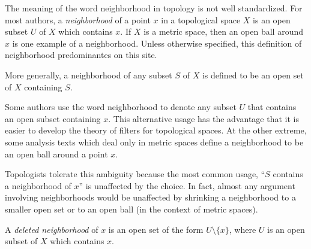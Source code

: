 \documentclass{article}
\begin{document}
The meaning of the word neighborhood in topology is not well standardized. For most authors, a \emph{neighborhood} of a point $x$ in a topological space $X$ is an open subset $U$ of $X$ which contains $x$. If $X$ is a metric space, then an open ball around $x$ is one example of a neighborhood. Unless otherwise specified, this definition of neighborhood predominantes on this site.

More generally, a neighborhood of any subset $S$ of $X$ is defined to be an open set of $X$ containing $S$.

Some authors use the word neighborhood to denote any subset $U$ that contains an open subset containing $x$. This alternative usage has the advantage that it is easier to develop the theory of filters for topological spaces. At the other extreme, some analysis texts which deal only in metric spaces define a neighborhood to be an open ball around a point $x$.

Topologists tolerate this ambiguity because the most common usage, ``$S$ contains a neighborhood of $x$'' is unaffected by the choice.  In fact, almost any argument involving neighborhoods would be unaffected by shrinking a neighborhood to a smaller open set or to an open ball (in the context of metric spaces). 

A \emph{deleted neighborhood} of $x$ is an open set of the form $U \setminus \{x\}$, where $U$ is an open subset of $X$ which contains $x$.
\end{document}
